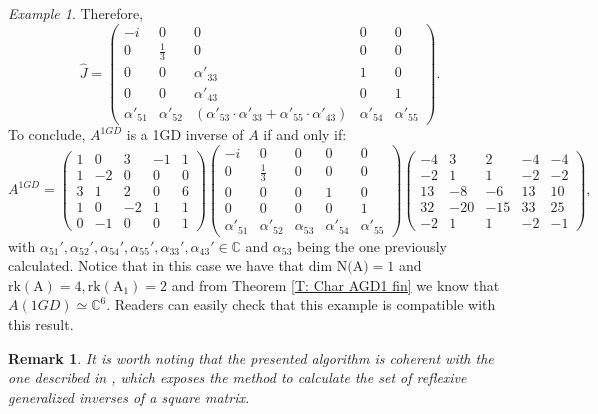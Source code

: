 \documentclass[10pt,a4paper]{amsart}
\theoremstyle{plain}
\newtheorem{rem}[defn]{Remark}
\theoremstyle{remark}
\newtheorem{exam}{Example}
\numberwithin{equation}{section} \numberwithin{defn}{section}
\begin{document}
\begin{exam}
Therefore, $$\hat{J}=\begin{pmatrix}
-i & 0 & 0 & 0 & 0 \\
0 & \frac{1}{3} & 0 & 0 & 0 \\
0 & 0 & \alpha'_{33} & 1 & 0 \\
0 & 0 & \alpha'_{43} & 0 & 1 \\
\alpha'_{51} & \alpha'_{52} & (\alpha'_{53}\cdot \alpha'_{33}+\alpha'_{55}\cdot \alpha'_{43}) & \alpha'_{54} & \alpha'_{55}
\end{pmatrix}. $$ To conclude, $A^{1GD}$ is a 1GD inverse of $A$ if and only if: $$A^{1GD}= \begin{pmatrix}
1 & 0 & 3 & -1 & 1 \\
1 & -2 & 0 & 0 & 0 \\
3 & 1 & 2 & 0 & 6 \\
1 & 0 & -2 & 1 & 1 \\
0 & -1 & 0 & 0 & 1
\end{pmatrix} \begin{pmatrix}
-i & 0 & 0 & 0 & 0 \\
0 & \frac{1}{3} & 0 & 0 & 0 \\
0 & 0 & 0 & 1 & 0 \\
0 & 0 & 0 & 0 & 1 \\
\alpha'_{51} & \alpha'_{52} & \alpha_{53} & \alpha'_{54} & \alpha'_{55}
\end{pmatrix}  \begin{pmatrix}
-4 & 3 & 2 & -4 & -4 \\
-2 & 1 & 1 & -2 & -2 \\
13 & -8 & -6 & 13 & 10 \\
32 & -20 & -15 & 33 & 25 \\
-2 & 1 & 1 & -2 & -1
\end{pmatrix},$$  with $\alpha_{51}',\alpha_{52}',\alpha_{54}',\alpha_{55}',\alpha_{33}',\alpha_{43}' \in \mathbb{C}$ and $\alpha_{53}$ being the one  previously calculated. Notice that in this case we have that $\text{dim N(A)}=1$ and $\mathrm{rk(A)}=4, \mathrm{rk(A_1)}=2$ and from Theorem \ref{T: Char AGD1 fin} we know that $A(1GD)\simeq \mathbb{C}^6$. Readers can easily check that this example is compatible with this result.
\end{exam}
 
\begin{rem}
It is worth noting that the presented algorithm is coherent with the one described in \cite[Section 5]{Die-Fpa}, which exposes the method to calculate the set of reflexive generalized inverses of a square matrix.
\end{rem}
\end{document}

